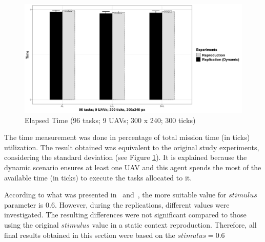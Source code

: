 \begin{figure}[h!]
	\begin{center}
		\includegraphics[scale=0.15]{fig/GRAPH05.png}
		\caption{Elapsed Time (96 tasks; 9 UAVs; 300 x 240; 300 ticks)}
		\label{fig:time}
	\end{center}
\end{figure}

The time measurement was done in percentage of total mission time (in ticks) utilization. The result obtained was equivalent to the original study experiments, considering the standard deviation (see Figure \ref{fig:time}). It is explained because the dynamic scenario ensures at least one UAV and this agent spends the most of the available time (in ticks) to execute the tasks allocated to it.

According to what was presented in~\citep{MAS07} and~\citep{ferreira2007swarm}, the more suitable value for $stimulus$ parameter is $0.6$. However, during the replications, different values were investigated. The resulting differences were not significant compared to those using the original $stimulus$ value in a static context reproduction. Therefore, all final results obtained in this section were based on the $stimulus = 0.6$
